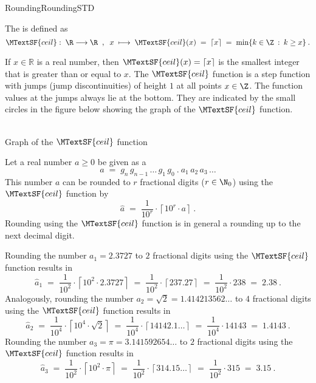 \begin{MXContent}{Rounding}{Rounding}{STD}
\begin{MInfo}
The  is defined as
$$
\MTextSF{ceil}:\; \R\longrightarrow\R\;\; , \;\;
x\;\longmapsto\; \MTextSF{ceil}(x)\;=\; \left\lceil{ x}\right\rceil\;=\; \min\lbrace k\in\Z\: :\: k\geq x\rbrace\: .
$$
\end{MInfo}

If $x\in \mathbb{R}$ is a real number, then $\MTextSF{ceil}(x)=\left\lceil{ x }\right\rceil$ is the smallest integer 
that is greater than or equal to $x$. The $\MTextSF{ceil}$ function is a step function with jumps (jump discontinuities) of height $1$ at all points  $x\in\Z$. The function values at the jumps always lie at the bottom. 
They are indicated by the small circles in the figure below showing the graph of the $\MTextSF{ceil}$ function. 

\begin{center}
\\
Graph of the $\MTextSF{ceil}$ function
\end{center}

Let a real number $a\geq 0$ be given as a 
$$
a \;=\; g_n\, g_{n-1}\, \ldots\, g_1\, g_0\: .\: a_1\,a_2\, a_3\, \ldots
$$
This number $a$ can be rounded to $r$ fractional digits ($r\in\N_0$) using the $\MTextSF{ceil}$ function by
$$
\hat{a} \;=\; \frac{1}{10^{r}}\cdot \left\lceil{ 10^{r}\cdot a }\right\rceil \: .
$$
Rounding using the $\MTextSF{ceil}$ function is in general a rounding up to the next decimal digit.

\begin{MExample}
Rounding the number $a_1=2.3727$ to $2$ fractional digits using the $\MTextSF{ceil}$ function results in
$$
\hat{a}_{1}\;=\; \frac{1}{10^{2}}\cdot \left\lceil{ 10^{2}\cdot 2.3727}\right\rceil\; =\; \frac{1}{10^{2}}\cdot \left\lceil{ 237.27}\right\rceil \;=\; \frac{1}{10^{2}}\cdot 238 \;=\; 2.38\: .
$$
Analogously, rounding the number $a_{2}=\sqrt{2}=1.414213562\ldots$ to $4$ fractional digits using the $\MTextSF{ceil}$ function results in
$$
\hat{a}_{2}\; =\; \frac{1}{10^{4}}\cdot \left\lceil{ 10^{4}\cdot \sqrt{2}}\right\rceil\; =\; \frac{1}{10^{4}}\cdot \left\lceil{ 14142.1\ldots}\right\rceil \;=\; \frac{1}{10^{4}}\cdot 14143\; =\; 1.4143\: .
$$
Rounding the number $a_{3}=\pi=3.141592654\ldots$ to $2$ fractional digits using the $\MTextSF{ceil}$ function results in
$$
\hat{a}_{3}\; =\; \frac{1}{10^{2}}\cdot \left\lceil{ 10^{2}\cdot \pi }\right\rceil\; =\; \frac{1}{10^{2}}\cdot \left\lceil{ 314.15\ldots }\right\rceil\; =\;\frac{1}{10^{2}}\cdot 315 \;=\; 3.15\: .
$$
\end{MExample}


\end{MXContent}
